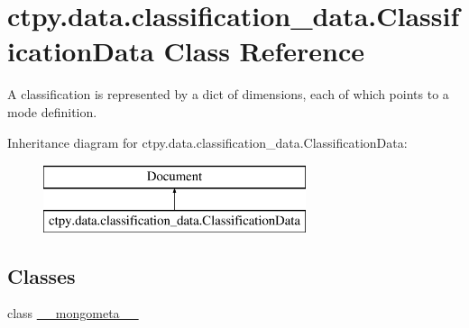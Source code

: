 \hypertarget{classctpy_1_1data_1_1classification__data_1_1_classification_data}{\section{ctpy.\-data.\-classification\-\_\-data.\-Classification\-Data Class Reference}
\label{classctpy_1_1data_1_1classification__data_1_1_classification_data}
}


A classification is represented by a dict of dimensions, each of which points to a mode definition.  


Inheritance diagram for ctpy.\-data.\-classification\-\_\-data.\-Classification\-Data\-:\begin{figure}[H]
\begin{center}
\leavevmode
\includegraphics[height=2.000000cm]{classctpy_1_1data_1_1classification__data_1_1_classification_data}
\end{center}
\end{figure}
\subsection*{Classes}
\begin{DoxyCompactItemize}
\item 
class \hyperlink{classctpy_1_1data_1_1classification__data_1_1_classification_data_1_1____mongometa____}{\-\_\-\-\_\-mongometa\-\_\-\-\_\-}
\end{DoxyCompactItemize}
